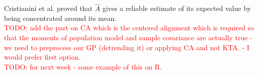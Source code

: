 Cristianini et al. proved that $\hat{A}$ gives a reliable estimate of its expected value by being concentrated around its mean. \\
\textcolor{red}{TODO: add the part on CA which is the centered alignment which is required so that the moments of population model and sample covariance are actually true - we need to preprocess our GP (detrending it) or applying CA and not KTA. - I would prefer first option.\\
TODO: for next week - some example of this on R.}